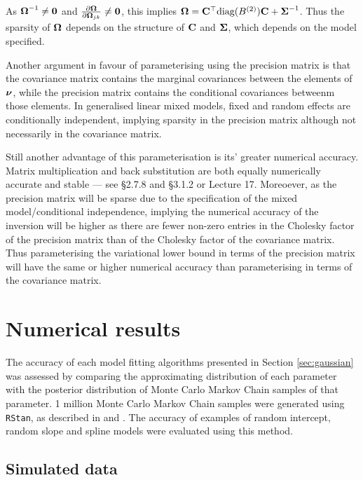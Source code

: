 As ${\boldsymbol \Omega}^{-1} \ne {\bf0}$ and $\tfrac{\partial {\boldsymbol\Omega}}{\partial {\boldsymbol\Omega}_{jk}} \ne {\bf0}$, this implies
${\boldsymbol \Omega} = {\bf C}^\top \text{diag}(B^{(2)}) {\bf C} + {\boldsymbol \Sigma}^{-1}$. Thus the sparsity of ${\boldsymbol \Omega}$ depends on the
structure of ${\bf C}$ and ${\boldsymbol \Sigma}$, which depends on the model specified.

Another argument in favour of parameterising using the precision matrix is that the covariance matrix contains
the marginal covariances between the elements of ${\boldsymbol \nu}$, while the precision matrix contains the conditional
covariances betweenm those elements. In generalised linear mixed models, fixed and random effects are
conditionally independent, implying sparsity in the precision matrix although not necessarily in the
covariance matrix.

Still another advantage of this parameterisation is its' greater numerical accuracy.
Matrix multiplication and back substitution are both equally numerically accurate and stable --- see
\cite{Golub:1996:MC:248979} \S2.7.8 and \S3.1.2 or \cite{trefethen97} Lecture 17. Moreoever, as the precision
matrix will be sparse due to the specification of the mixed model/conditional independence, implying the
numerical accuracy of the inversion will be higher as there are fewer non-zero entries in the Cholesky factor
of the precision matrix than of the Cholesky factor of the covariance matrix. Thus parameterising the
variational lower bound in terms of the precision matrix will have the same or higher numerical accuracy than
parameterising in terms of the covariance matrix.

\section{Numerical results}
\label{sec:results}
		
The accuracy of each model fitting algorithms presented in Section \ref{sec:gaussian} was assessed by
comparing the approximating distribution of each parameter with the posterior distribution of Monte Carlo
Markov Chain samples of that parameter. 1 million Monte Carlo Markov Chain samples were generated using
\texttt{RStan}, as described in \cite{Carpenter2016} and \cite{StanDevelopmentTeam2016}. The accuracy of
examples of random intercept, random slope and spline models were evaluated using this method.
		
\subsection{Simulated data}
		
